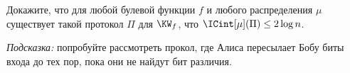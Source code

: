 Докажите, что для любой булевой функции $f$ и любого распределения $\mu$ существует такой протокол $\Pi$ для
$\KW_f$, что $\ICint[\mu](\Pi) \le 2 \log n$. 
    
\textit{Подсказка:} попробуйте рассмотреть прокол, где Алиса пересылает Бобу биты входа до тех пор, пока они не
найдут бит различия.